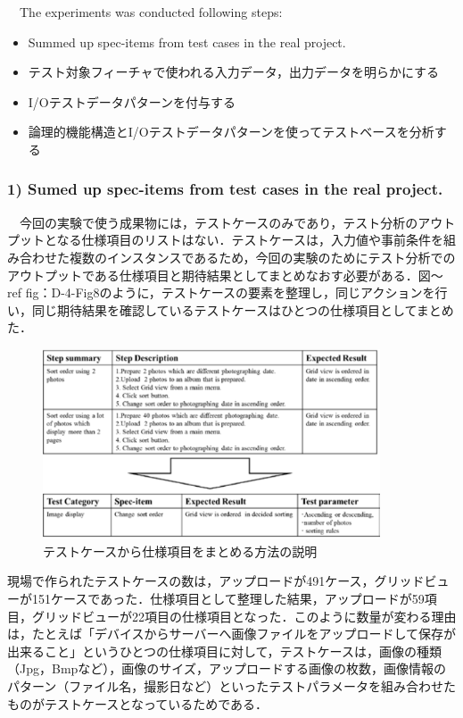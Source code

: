\documentclass[a4paper,11pt]{jreport}
\begin{document}
　The experiments was conducted following steps:


\begin{itemize}
\item Summed up spec-items from test cases in the real project.
\item テスト対象フィーチャで使われる入力データ，出力データを明らかにする
\item I/Oテストデータパターンを付与する
\item 論理的機能構造とI/Oテストデータパターンを使ってテストベースを分析する
\end{itemize}

\subsubsection{1) Sumed up spec-items from test cases in the real project.}
　今回の実験で使う成果物には，テストケースのみであり，テスト分析のアウトプットとなる仕様項目のリストはない．テストケースは，入力値や事前条件を組み合わせた複数のインスタンスであるため，今回の実験のためにテスト分析でのアウトプットである仕様項目と期待結果としてまとめなおす必要がある．図〜ref {fig：D-4-Fig8}のように，テストケースの要素を整理し，同じアクションを行い，同じ期待結果を確認しているテストケースはひとつの仕様項目としてまとめた．

   \begin{figure}[htbp]
  \begin{center}
  \includegraphics[width=10cm]{./image/D-4-Fig8.png}
  \caption{テストケースから仕様項目をまとめる方法の説明}
  \label{fig:D-4-Fig8}
  \end{center}
   \end{figure}

現場で作られたテストケースの数は，アップロードが491ケース，グリッドビューが151ケースであった．仕様項目として整理した結果，アップロードが59項目，グリッドビューが22項目の仕様項目となった．このように数量が変わる理由は，たとえば「デバイスからサーバーへ画像ファイルをアップロードして保存が出来ること」というひとつの仕様項目に対して，テストケースは，画像の種類（Jpg，Bmpなど），画像のサイズ，アップロードする画像の枚数，画像情報のパターン（ファイル名，撮影日など）といったテストパラメータを組み合わせたものがテストケースとなっているためである．
\end{document}
